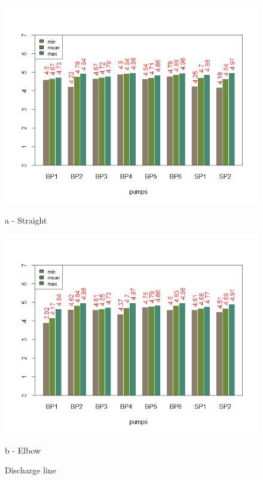 \begin{figure}[!htb]
	\begin{minipage}[b]{0.5\linewidth}
		\centering
		\includegraphics[width=\textwidth]{figures/ch05_thickness_discharge}
		\caption*{a - Straight} 
	\end{minipage}
	\hspace{0.05cm}
	\begin{minipage}[b]{0.5\linewidth}
		\centering
		\includegraphics[width=\textwidth]{figures/ch05_thickness_dischargee}
		\caption*{b - Elbow} 
	\end{minipage}
	\caption{Discharge line}
	\label{ch05_thickness_dicharge}
\end{figure}

